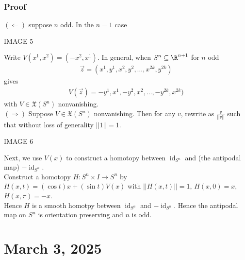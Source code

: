 \documentclass[11pt]{article}
\begin{document}
\subsubsection*{Proof}
\label{sec:orgef1f8d0}
\((\Longleftarrow)\) suppose \(n\) odd. In the \(n=1\) case\\
\begin{center}
IMAGE 5\\
\end{center}
Write \(V(x^{1},x^{2})=(-x^{2},x^{1})\). In general, when \(S^{n}\subseteq\R^{n+1}\) for \(n\) odd\\
\begin{align*}
  \vec{z}=(x^{1},y^{1},x^{2},y^{2},\ldots,x^{2k},y^{2k})
\end{align*}
gives\\
\begin{align*}
  V(\vec{z})=-y^{1},x^{1},-y^{2},x^{2},\ldots,-y^{2k},x^{2k})
\end{align*}
with \(V\in\mathfrak{X}(S^{n})\) nonvanishing.\\
\((\Longrightarrow)\) Suppose \(V\in\mathfrak{X}(S^{n})\) nonvanishing. Then for any \(v\), rewrite as \(\frac{v}{||v||}\) such that without loss of generality \(||1||=1\).\\
\begin{center}
IMAGE 6\\
\end{center}
Next, we use \(V(x)\) to construct a homotopy between \(\operatorname{id}_{S^{n}}\) and (the antipodal map) \(-\operatorname{id}_{S^{n}}\).\\
Construct a homotopy \(H:S^{n}\times I\to S^{n}\) by \(H(x,t)=(\cos t)x+(\sin t)V(x)\) with \(||H(x,t)||=1\), \(H(x,0)=x\), \(H(x,\pi)=-x\).\\
Hence \(H\) is a smooth homotpy between \(\operatorname{id}_{S^{n}}\) and \(-\operatorname{id}_{S^{n}}\). Hence the antipodal map on \(S^{n}\) is orientation preserving and \(n\) is odd.\\
\section*{March 3, 2025}
\label{sec:org211c6c7}
\end{document}
